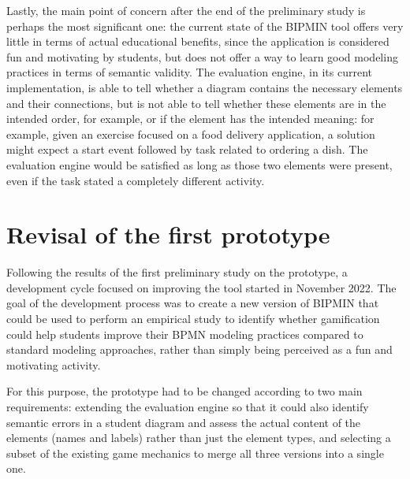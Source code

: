 Lastly, the main point of concern after the end of the preliminary study is perhaps the most significant one: the current state of the BIPMIN tool offers very little in terms of actual educational benefits, since the application is considered fun and motivating by students, but does not offer a way to learn good modeling practices in terms of semantic validity. The evaluation engine, in its current implementation, is able to tell whether a diagram contains the necessary elements and their connections, but is not able to tell whether these elements are in the intended order, for example, or if the element has the intended meaning: for example, given an exercise focused on a food delivery application, a solution might expect a start event followed by task related to ordering a dish. The evaluation engine would be satisfied as long as those two elements were present, even if the task stated a completely different activity.




\section{Revisal of the first prototype}

Following the results of the first preliminary study on the prototype, a development cycle focused on improving the tool started in November 2022. The goal of the development process was to create a new version of BIPMIN that could be used to perform an empirical study to identify whether gamification could help students improve their BPMN modeling practices compared to standard modeling approaches, rather than simply being perceived as a fun and motivating activity.

For this purpose, the prototype had to be changed according to two main requirements: extending the evaluation engine so that it could also identify semantic errors in a student diagram and assess the actual content of the elements (names and labels) rather than just the element types, and selecting a subset of the existing game mechanics to merge all three versions into a single one.

